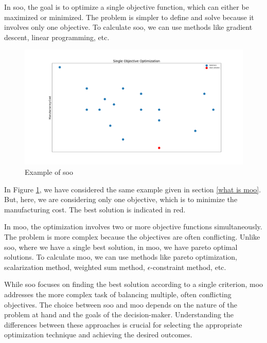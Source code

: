 In \acrfull{soo}, the goal is to optimize a single objective function, which can either be maximized or minimized. The  problem is simpler to define and solve
because it involves only one objective. To calculate \acrshort{soo}, we can use methods like gradient descent, linear programming, etc.

\begin{figure}[!h]
    \centering
    \includegraphics[width=\textwidth]{Images/soo.png}
    \caption{Example of \acrshort{soo}}
    \label{soo}
\end{figure}

In Figure \ref{soo}, we have considered the same example given in section \ref{what is moo}. But, here, we are considering only one objective, which is to
minimize the manufacturing cost. The best solution is indicated in red.
\vspace{15pt}

In \acrfull{moo}, the optimization involves two or more objective functions simultaneously. The problem is more complex because the objectives are often
conflicting. Unlike \acrshort{soo}, where we have a single best solution, in \acrshort{moo}, we have pareto optimal solutions.
To calculate \acrshort{moo}, we can use methods like pareto optimization, scalarization method, weighted sum method, $\epsilon$-constraint method, etc.


While \acrshort{soo} focuses on finding the best solution according to a single criterion, \acrshort{moo} addresses the more complex task of balancing multiple, 
often conflicting objectives. The choice between \acrshort{soo} and \acrshort{moo} depends on the nature of the problem at hand and the goals of the decision-maker. 
Understanding the differences between these approaches is crucial for selecting the appropriate optimization technique and achieving the desired outcomes.

